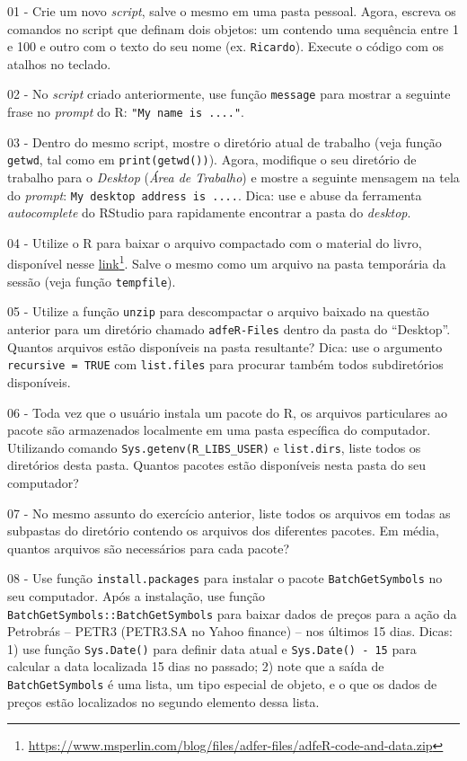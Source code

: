 \documentclass[
  11pt,
]{book}
\begin{document}
01 -
Crie um novo \emph{script}, salve o mesmo em uma pasta pessoal. Agora, escreva os comandos no script que definam dois objetos: um contendo uma sequência entre 1 e 100 e outro com o texto do seu nome (ex. \texttt{\textquotesingle{}Ricardo\textquotesingle{}}). Execute o código com os atalhos no teclado.

02 -
No \emph{script} criado anteriormente, use função \texttt{message} para mostrar a seguinte frase no \emph{prompt} do R: \texttt{"My\ name\ is\ ...."}.

03 -
Dentro do mesmo script, mostre o diretório atual de trabalho (veja função \texttt{getwd}, tal como em \texttt{print(getwd())}). Agora, modifique o seu diretório de trabalho para o \emph{Desktop} (\emph{Área de Trabalho}) e mostre a seguinte mensagem na tela do \emph{prompt}: \texttt{\textquotesingle{}My\ desktop\ address\ is\ ....\textquotesingle{}}. Dica: use e abuse da ferramenta \emph{autocomplete} do RStudio para rapidamente encontrar a pasta do \emph{desktop}.

04 -
Utilize o R para baixar o arquivo compactado com o material do livro, disponível nesse \href{https://www.msperlin.com/blog/files/adfer-files/adfeR-code-and-data.zip}{link}\footnote{\url{https://www.msperlin.com/blog/files/adfer-files/adfeR-code-and-data.zip}}. Salve o mesmo como um arquivo na pasta temporária da sessão (veja função \texttt{tempfile}).

05 -
Utilize a função \texttt{unzip} para descompactar o arquivo baixado na questão anterior para um diretório chamado \texttt{\textquotesingle{}adfeR-Files\textquotesingle{}} dentro da pasta do ``Desktop''. Quantos arquivos estão disponíveis na pasta resultante? Dica: use o argumento \texttt{recursive\ =\ TRUE} com \texttt{list.files} para procurar também todos subdiretórios disponíveis.

06 -
Toda vez que o usuário instala um pacote do R, os arquivos particulares ao pacote são armazenados localmente em uma pasta específica do computador. Utilizando comando \texttt{Sys.getenv(\textquotesingle{}R\_LIBS\_USER\textquotesingle{})} e \texttt{list.dirs}, liste todos os diretórios desta pasta. Quantos pacotes estão disponíveis nesta pasta do seu computador?

07 -
No mesmo assunto do exercício anterior, liste todos os arquivos em todas as subpastas do diretório contendo os arquivos dos diferentes pacotes. Em média, quantos arquivos são necessários para cada pacote?

08 -
Use função \texttt{install.packages} para instalar o pacote \texttt{BatchGetSymbols} no seu computador. Após a instalação, use função \texttt{BatchGetSymbols::BatchGetSymbols} para baixar dados de preços para a ação da Petrobrás -- PETR3 (PETR3.SA no Yahoo finance) -- nos últimos 15 dias. Dicas: 1) use função \texttt{Sys.Date()} para definir data atual e \texttt{Sys.Date()\ -\ 15} para calcular a data localizada 15 dias no passado; 2) note que a saída de \texttt{BatchGetSymbols} é uma lista, um tipo especial de objeto, e o que os dados de preços estão localizados no segundo elemento dessa lista.
\end{document}
